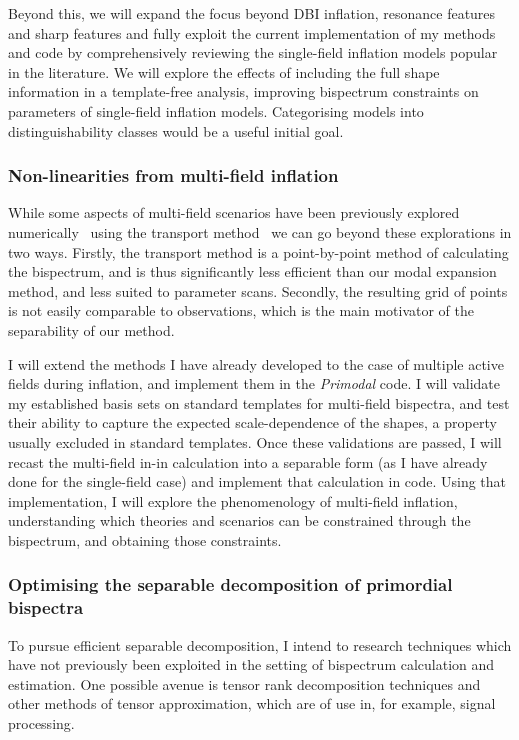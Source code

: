 Beyond this,
we will expand the focus beyond DBI inflation, resonance features and sharp features
and fully exploit the current implementation of my methods and code
by comprehensively reviewing the single-field inflation models popular in the literature.
We will explore the effects of including the full shape information in a template-free analysis,
improving bispectrum constraints on parameters of single-field inflation models.
Categorising models into distinguishability classes would be a useful initial goal.

\subsubsection*{Non-linearities from multi-field inflation}
While some aspects of multi-field scenarios have been previously explored
numerically~\cite{Fumagalli_2019} using the transport method~\cite{transport_pytransport_2}
we can go beyond these explorations in two ways. Firstly, the transport method is a
point-by-point method of calculating the bispectrum, and is thus significantly
less efficient than our modal expansion method, and less suited to parameter scans.
Secondly, the resulting grid of points is not easily comparable to observations,
which is the main motivator of the separability of our method.

I will extend the methods I have already developed to the case of multiple active fields during inflation, and implement them in the \textit{Primodal} code.
I will validate my established basis sets on standard templates for multi-field bispectra,
and test their ability to capture the expected scale-dependence of the shapes,
a property usually excluded in standard templates.
Once these validations are passed, I will recast the multi-field in-in calculation
into a separable form (as I have already done for the single-field case)
and implement that calculation in code. Using that implementation,
I will explore the phenomenology of multi-field inflation,
understanding which theories and scenarios can be constrained through the bispectrum, and obtaining those constraints.

\subsubsection*{Optimising the separable decomposition of primordial bispectra}
To pursue efficient separable decomposition, I intend to research techniques which have not
previously been exploited in the setting of bispectrum calculation and estimation.
One possible avenue is tensor rank decomposition techniques and other methods of tensor approximation,
which are of use in, for example, signal processing.

